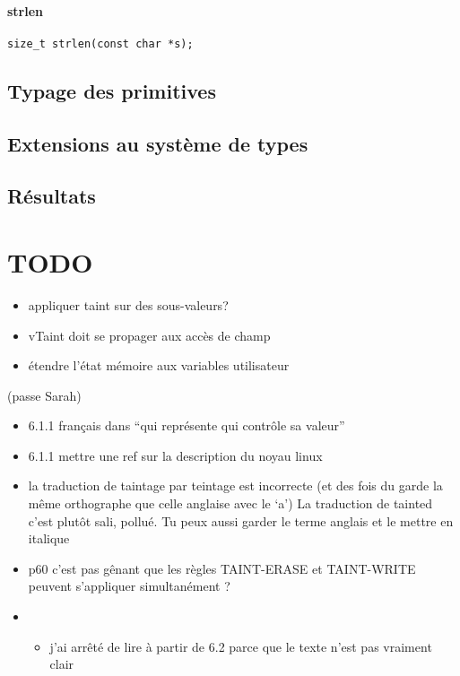 \paragraph{strlen}
\begin{Verbatim}
size_t strlen(const char *s);
\end{Verbatim}

\subsection{Typage des primitives}

\subsection{Extensions au système de types}

\subsection{Résultats}%

\section*{TODO}

\begin{itemize}
\item appliquer taint sur des sous-valeurs?
\item vTaint doit se propager aux accès de champ
\item étendre l'état mémoire aux variables utilisateur
\end{itemize}

(passe Sarah)

\begin{itemize}
\item
  6.1.1 français dans ``qui représente qui contrôle sa valeur''
\item
  6.1.1 mettre une ref sur la description du noyau linux
\item
  la traduction de taintage par teintage est incorrecte (et des fois du
  garde la même orthographe que celle anglaise avec le `a') La
  traduction de tainted c'est plutôt sali, pollué. Tu peux aussi garder
  le terme anglais et le mettre en italique
\item
  p60 c'est pas gênant que les règles TAINT-ERASE et TAINT-WRITE peuvent
  s'appliquer simultanément ?
\item
  \begin{itemize}
  \item
    j'ai arrêté de lire à partir de 6.2 parce que le texte n'est pas
    vraiment clair
  \end{itemize}
\end{itemize}

